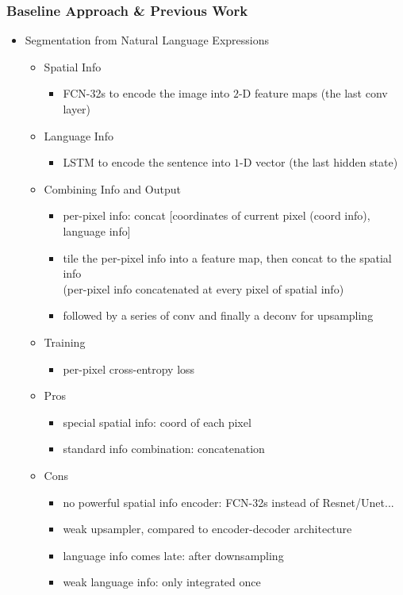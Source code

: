 \subsubsection{Baseline Approach \& Previous Work}
\begin{itemize}
\item Segmentation from Natural Language Expressions
	\begin{itemize}
	\item Spatial Info
		\begin{itemize}
		\item FCN-32s to encode the image into $2$-D feature maps (the last conv layer)
		\end{itemize}
	\item Language Info
		\begin{itemize}
		\item LSTM to encode the sentence into $1$-D vector (the last hidden state)
		\end{itemize}
	\item Combining Info and Output
		\begin{itemize}
		\item per-pixel info: concat [coordinates of current pixel (coord info), language info]
		\item tile the per-pixel info into a feature map, then concat to the spatial info \\
		(per-pixel info concatenated at every pixel of spatial info)
		\item followed by a series of conv and finally a deconv for upsampling
		\end{itemize}
	\item Training
		\begin{itemize}
		\item per-pixel cross-entropy loss
		\end{itemize}
	\item Pros
		\begin{itemize}
		\item special spatial info: coord of each pixel
		\item standard info combination: concatenation
		\end{itemize}
	\item Cons
		\begin{itemize}
		\item no powerful spatial info encoder: FCN-32s instead of Resnet/Unet...
		\item weak upsampler, compared to encoder-decoder architecture
		\item language info comes late: after downsampling
		\item weak language info: only integrated once
		\end{itemize}
	\end{itemize}


\end{itemize}
